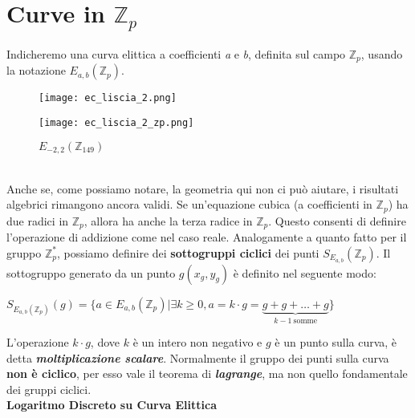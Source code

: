 \section{Curve in $\mathbb{Z}_p$}
Indicheremo una curva elittica a coefficienti \textit{a} e \textit{b}, definita sul campo $\mathbb{Z}_p$, usando la notazione $E_{a,b}(\mathbb{Z}_p)$.
\begin{figure}[h]
    \centering
    \begin{minipage}[t]{0.45\textwidth}
        \centering
        \texttt{[image: ec\_liscia\_2.png]}
        \caption{$E_{(-2, -2)}$}
    \end{minipage}
    \hfill
    \begin{minipage}[t]{0.45\textwidth}
        \centering
        \texttt{[image: ec\_liscia\_2\_zp.png]}
        \caption{$E_{-2, 2}(\mathbb{Z}_{149})$}
    \end{minipage}
\end{figure}
\   \\
Anche se, come possiamo notare, la geometria qui non ci può aiutare, i risultati algebrici rimangono ancora validi. Se un'equazione cubica (a coefficienti in $\mathbb{Z}_p$) ha due radici in $\mathbb{Z}_p$, allora ha anche la terza radice in $\mathbb{Z}_p$. Questo consenti di definire l'operazione di addizione come nel caso reale. Analogamente a quanto fatto per il gruppo $\mathbb{Z}_p^*$, possiamo definire dei \textbf{sottogruppi ciclici} dei punti $S_{E_{a,b}}(\mathbb{Z}_p)$. Il sottogruppo generato da un punto $g(x_g, y_g)$ è definito nel seguente modo:
\begin{center}
    \begin{math}
        S_{E_{a,b}(\mathbb{Z}_p)}(g)=\{a\in E_{a,b}(\mathbb{Z}_p)|\exists k\geq0, a = k\cdot g = \underbrace{g+g+\ldots+g}_{k-1\ \mathrm{somme}}\}
    \end{math}
\end{center}
L'operazione $k\cdot g$, dove $k$ è un intero non negativo e $g$ è un punto sulla curva, è detta \textbf{\textit{moltiplicazione scalare}}. Normalmente il gruppo dei punti sulla curva \textbf{non è ciclico}, per esso vale il teorema di \textbf{\textit{lagrange}}, ma non quello fondamentale dei gruppi ciclici.
\\ \newline
\textbf{Logaritmo Discreto su Curva Elittica} \\
